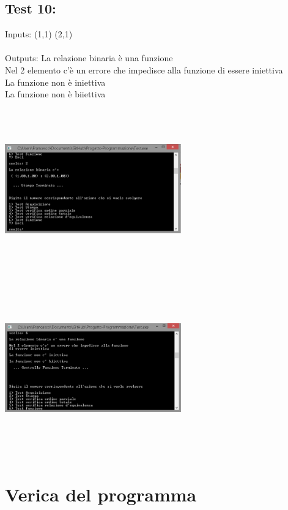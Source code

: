 \documentclass[11pt, a4paper, titlepage, block]{article}
\begin{document}
	\subsection{Test 10:}
	Inputs: (1,1)  (2,1) \\
	\\
	Outputs: La relazione binaria \`e  una funzione\\
	Nel 2 elemento c'\`e un errore che impedisce alla funzione di essere iniettiva\\
	La funzione non \`e  iniettiva\\
	La funzione non \`e  biiettiva\\
	\includegraphics[width=3in,height=3in,viewport=0 0 300 300]{../Screenshots/Test10Input.png}
	\\
	\includegraphics[width=3in,height=3in,viewport=0 0 300 300]{../Screenshots/Test10Output.PNG}
	\newpage
	\section{Verica del programma}
\end{document}
